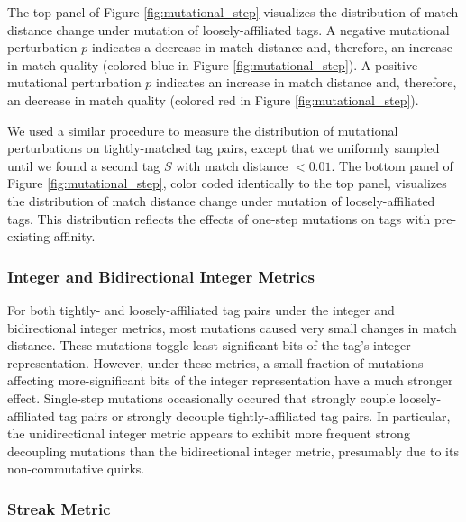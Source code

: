 The top panel of Figure \ref{fig:mutational_step} visualizes the distribution of match distance change under mutation of loosely-affiliated tags.
A negative mutational perturbation $p$ indicates a decrease in match distance and, therefore, an increase in match quality (colored blue in Figure \ref{fig:mutational_step}).
A positive mutational perturbation $p$ indicates an increase in match distance and, therefore, an decrease in match quality (colored red in Figure \ref{fig:mutational_step}).

We used a similar procedure to measure the distribution of mutational perturbations on tightly-matched tag pairs, except that we uniformly sampled until we found a second tag $S$ with match distance $< 0.01$.
The bottom panel of Figure \ref{fig:mutational_step}, color coded identically to the top panel, visualizes the distribution of match distance change under mutation of loosely-affiliated tags.
This distribution reflects the effects of one-step mutations on tags with pre-existing affinity.

\subsubsection{Integer and Bidirectional Integer Metrics}

For both tightly- and loosely-affiliated tag pairs under the integer and bidirectional integer metrics, most mutations caused very small changes in match distance.
These mutations toggle least-significant bits of the tag's integer representation.
However, under these metrics, a small fraction of mutations affecting more-significant bits of the integer representation have a much stronger effect.
Single-step mutations occasionally occured that strongly couple loosely-affiliated tag pairs or strongly decouple tightly-affiliated tag pairs.
In particular, the unidirectional integer metric appears to exhibit more frequent strong decoupling mutations than the bidirectional integer metric, presumably due to its non-commutative quirks.

\subsubsection{Streak Metric}

